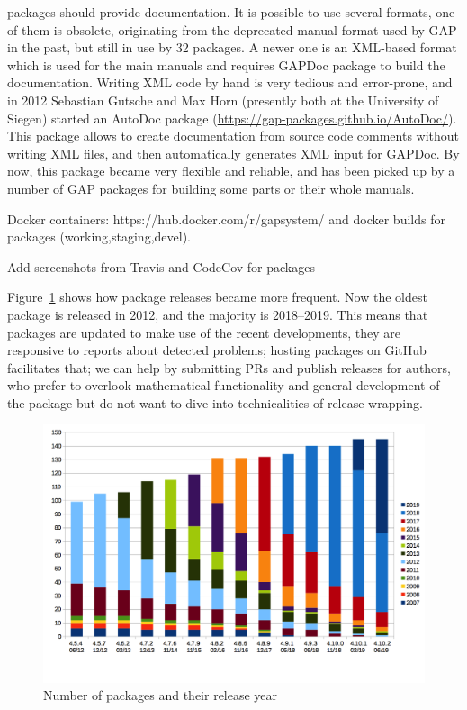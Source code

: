 \documentclass{deliverablereport}
\renewcommand{\comment}[1]{\TODO{Comment: #1}}
\begin{document}
\GAP packages should provide documentation. It is possible to use several
formats, one of them is obsolete, originating from the deprecated 
manual format used by GAP in the past, but still in use by 32 packages.
A newer one is an XML-based format which is used for the main \GAP manuals
and requires {\sf GAPDoc package} to build the documentation. Writing XML
code by hand is very tedious and error-prone, and in 2012 Sebastian Gutsche 
and Max Horn (presently both at the University of Siegen) started an 
{\sf AutoDoc} package (\url{https://gap-packages.github.io/AutoDoc/}).
This package allows to create documentation from source code comments
without writing XML files, and then automatically generates XML input
for GAPDoc. By now, this package became very flexible and reliable, and
has been picked up by a number \comment{how many} of GAP packages for building 
some parts or their whole manuals.

Docker containers: https://hub.docker.com/r/gapsystem/ 
and docker builds for packages (working,staging,devel).

Add screenshots from Travis and CodeCov for packages


Figure~\ref{fig:gap-package-releases} shows how package releases became more frequent.
Now the oldest package is released in 2012, and the majority is 2018--2019. 
This means that packages are updated to make use of the recent \GAP developments,
they are responsive to reports about detected problems; hosting packages on GitHub
facilitates that; we can help by submitting PRs and publish releases for authors,
who prefer to overlook mathematical functionality and general development of the
package but do not want to dive into technicalities of release wrapping.

\begin{figure}[!ht]
    \centering
    \includegraphics[width=\textwidth]{images/gap-package-releases}
    \caption{Number of \GAP packages and their release year}
    \label{fig:gap-package-releases}
\end{figure}
\end{document}
